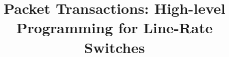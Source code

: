 \documentclass{sig-alternate-10pt}
\begin{document}
\date{}

\title{Packet Transactions: High-level Programming for Line-Rate Switches}

\maketitle







%



\balance
{\small 
}

%
\end{document}
